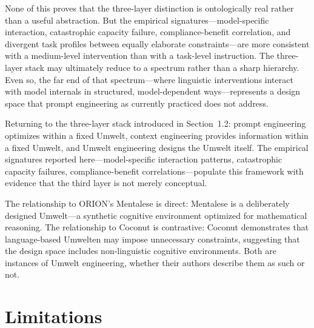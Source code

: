 \documentclass[11pt,a4paper]{article}
\begin{document}
None of this proves that the three-layer distinction is ontologically real rather than a useful abstraction. But the empirical signatures---model-specific interaction, catastrophic capacity failure, compliance-benefit correlation, and divergent task profiles between equally elaborate constraints---are more consistent with a medium-level intervention than with a task-level instruction. The three-layer stack may ultimately reduce to a spectrum rather than a sharp hierarchy. Even so, the far end of that spectrum---where linguistic interventions interact with model internals in structured, model-dependent ways---represents a design space that prompt engineering as currently practiced does not address.

Returning to the three-layer stack introduced in Section~1.2: prompt engineering optimizes within a fixed Umwelt, context engineering provides information within a fixed Umwelt, and Umwelt engineering designs the Umwelt itself. The empirical signatures reported here---model-specific interaction patterns, catastrophic capacity failures, compliance-benefit correlations---populate this framework with evidence that the third layer is not merely conceptual.

The relationship to ORION's Mentalese \citep{tanmay2025} is direct: Mentalese is a deliberately designed Umwelt---a synthetic cognitive environment optimized for mathematical reasoning. The relationship to Coconut \citep{hao2024} is contrastive: Coconut demonstrates that language-based Umwelten may impose unnecessary constraints, suggesting that the design space includes non-linguistic cognitive environments. Both are instances of Umwelt engineering, whether their authors describe them as such or not.

\section{Limitations}
\label{sec:limitations}
\end{document}
